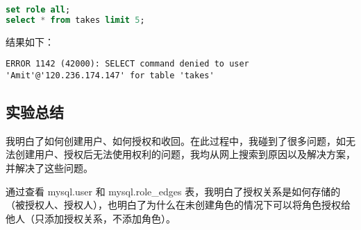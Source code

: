 \documentclass{article}
\begin{document}
\begin{lstlisting}[language=sql]
set role all;
select * from takes limit 5;
\end{lstlisting}

结果如下：

\begin{lstlisting}
ERROR 1142 (42000): SELECT command denied to user 'Amit'@'120.236.174.147' for table 'takes'
\end{lstlisting}

\subsection{实验总结}

我明白了如何创建用户、如何授权和收回。在此过程中，我碰到了很多问题，如无法创建用户、授权后无法使用权利的问题，我均从网上搜索到原因以及解决方案，并解决了这些问题。

通过查看 mysql.user 和 mysql.role\_edges 表，我明白了授权关系是如何存储的（被授权人、授权人），也明白了为什么在未创建角色的情况下可以将角色授权给他人（只添加授权关系，不添加角色）。
\end{document}
